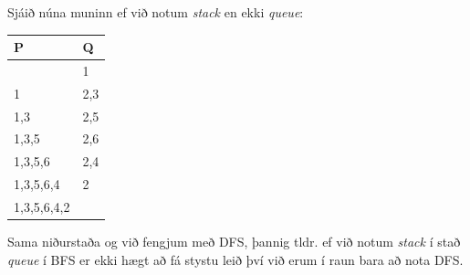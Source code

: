 \documentclass{article}
\begin{document}
Sjáið núna muninn ef við notum \emph{stack} en ekki \emph{queue}:
\begin{center}
    \begin{tabular}{|l|l|}
        \hline
        P&Q\\
        \hline
        &1\\
        \hline
        1&2,3\\
        \hline
        1,3&2,5\\
        \hline
        1,3,5&2,6\\
        \hline
        1,3,5,6&2,4\\
        \hline
        1,3,5,6,4&2\\
        \hline
        1,3,5,6,4,2&\\
        \hline
    \end{tabular}
\end{center}
Sama niðurstaða og við fengjum með DFS, þannig tldr. ef við notum \emph{stack} í stað \emph{queue} í BFS er ekki hægt að fá stystu leið því við erum í raun bara að nota DFS.
\end{document}
